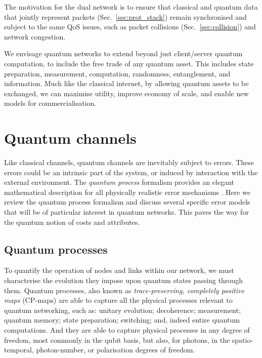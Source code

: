 \documentclass[aps,rmp,twocolumn,amsmath,amssymb,nofootinbib,superscriptaddress,longbibliography,floatfix]{revtex4-1}
\begin{document}
The motivation for the dual network is to ensure that classical and quantum data that jointly represent packets (Sec.~\ref{sec:prot_stack}) remain synchronised and subject to the same QoS issues, such as packet collisions (Sec.~\ref{sec:collision}) and network congestion.

We envisage quantum networks to extend beyond just client/server quantum computation, to include the free trade of any quantum asset. This includes state preparation, measurement, computation, randomness, entanglement, and information. Much like the classical internet, by allowing quantum assets to be exchanged, we can maximise utility, improve economy of scale, and enable new models for commercialisation.

%
%

\section{Quantum channels} \label{sec:quant_chan}

Like classical channels, quantum channels are inevitably subject to errors. These errors could be an intrinsic part of the system, or induced by interaction with the external environment. The \emph{quantum process} formalism provides an elegant mathematical description for all physically realistic error mechanisms \cite{bib:NielsenChuang00, bib:Gilchrist05}. Here we review the quantum process formalism and discuss several specific error models that will be of particular interest in quantum networks. This paves the way for the quantum notion of costs and attributes.

%
%

\subsection{Quantum processes}

To quantify the operation of nodes and links within our network, we must characterise the evolution they impose upon quantum states passing through them. Quantum processes, also known as \emph{trace-preserving, completely positive maps} (CP-maps) are able to capture all the physical processes relevant to quantum networking, such as: unitary evolution; decoherence; measurement; quantum memory; state preparation; switching; and, indeed entire quantum computations. And they are able to capture physical processes in any degree of freedom, most commonly in the qubit basis, but also, for photons, in the spatio-temporal, photon-number, or polarisation degrees of freedom.
\end{document}

